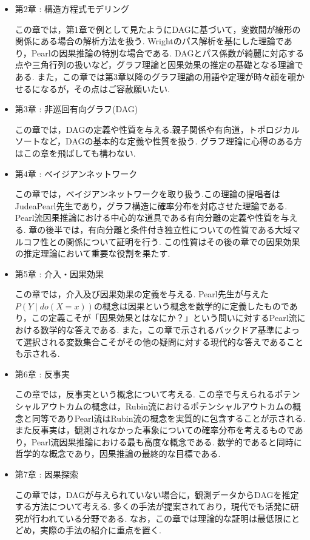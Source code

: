 \documentclass[uplatex, dvipdfmx]{jsarticle}
\begin{document}
\begin{itemize}
  \item 第2章 : 構造方程式モデリング
  
  この章では，第1章で例として見たようにDAGに基づいて，変数間が線形の関係にある場合の解析方法を扱う.
  Wrightのパス解析を基にした理論であり，Pearlの因果推論の特別な場合である.
  DAGとパス係数が綺麗に対応する点や三角行列の扱いなど，グラフ理論と因果効果の推定の基礎となる理論である.
  また，この章では第3章以降のグラフ理論の用語や定理が時々顔を覗かせるになるが，その点はご容赦願いたい.
  
  \item 第3章 : 非巡回有向グラフ(DAG)
  
  この章では，DAGの定義や性質を与える.親子関係や有向道，トポロジカルソートなど，DAGの基本的な定義や性質を扱う.
  グラフ理論に心得のある方はこの章を飛ばしても構わない.

  \item 第4章 : ベイジアンネットワーク
  
  この章では，ベイジアンネットワークを取り扱う.この理論の提唱者はJudeaPearl先生であり，グラフ構造に確率分布を対応させた理論である.
  Pearl流因果推論における中心的な道具である有向分離の定義や性質を与える.
  章の後半では，有向分離と条件付き独立性についての性質である大域マルコフ性との関係について証明を行う.
  この性質はその後の章での因果効果の推定理論において重要な役割を果たす.
  
  \item 第5章 : 介入・因果効果
  
  この章では，介入及び因果効果の定義を与える.
  Pearl先生が与えた$P(Y \mid do(X=x))$の概念は因果という概念を数学的に定義したものであり，この定義こそが「因果効果とはなにか？」という問いに対するPearl流における数学的な答えである.
  また，この章で示されるバックドア基準によって選択される変数集合こそがその他の疑問に対する現代的な答えであることも示される.

  \item 第6章 : 反事実
  
  この章では，反事実という概念について考える.
  この章で与えられるポテンシャルアウトカムの概念は，Rubin流におけるポテンシャルアウトカムの概念と同等でありPearl流はRubin流の概念を実質的に包含することが示される.
  また反事実は，観測されなかった事象についての確率分布を考えるものであり，Pearl流因果推論における最も高度な概念である.
  数学的であると同時に哲学的な概念であり，因果推論の最終的な目標である.

  \item 第7章 : 因果探索
  
  この章では，DAGが与えられていない場合に，観測データからDAGを推定する方法について考える.
  多くの手法が提案されており，現代でも活発に研究が行われている分野である.
  なお，この章では理論的な証明は最低限にとどめ，実際の手法の紹介に重点を置く.
\end{itemize}
\end{document}
